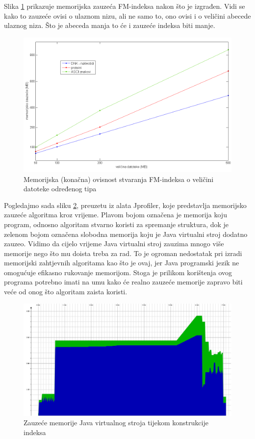 Slika \ref{fig:test_mem_kon} prikazuje memorijska zauzeća FM-indeksa nakon što je izgrađen. Vidi se kako to zauzeće ovisi o ulaznom nizu, ali ne samo to, ono ovisi i o veličini abecede ulaznog niza. Što je abeceda manja to će i zauzeće indeksa biti manje.

\begin{figure}[H]
   \centering
       \includegraphics[width=\textwidth]{./pictures/test_mem_kon.png}
 \caption{Memorijska (konačna) ovisnost stvaranja FM-indeksa o veličini datoteke određenog tipa}
 \label{fig:test_mem_kon}
\end{figure}




Pogledajmo sada sliku \ref{fig:profiler}, preuzetu iz alata Jprofiler, koje predstavlja memorijsko zauzeće algoritma kroz vrijeme. Plavom bojom označena je memorija koju program, odnosno algoritam stvarno koristi za spremanje struktura, dok je zelenom bojom označena slobodna memorija koju je Java virtualni stroj dodatno zauzeo. Vidimo da cijelo vrijeme Java virtualni stroj zauzima mnogo više memorije nego što mu doista treba za rad. To je ogroman nedostatak pri izradi memorijski zahtjevnih algoritama kao što je ovaj, jer Java programski jezik ne omogućuje efikasno rukovanje memorijom. Stoga je prilikom korištenja ovog programa potrebno imati na umu kako će realno zauzeće memorije zapravo biti veće od onog što algoritam zaista koristi.

\begin{figure}[H]
   \centering
       \includegraphics[width=\linewidth]{./pictures/profiler.jpg}
 \caption{Zauzeće memorije Java virtualnog stroja tijekom konstrukcije indeksa}
 \label{fig:profiler}
\end{figure}